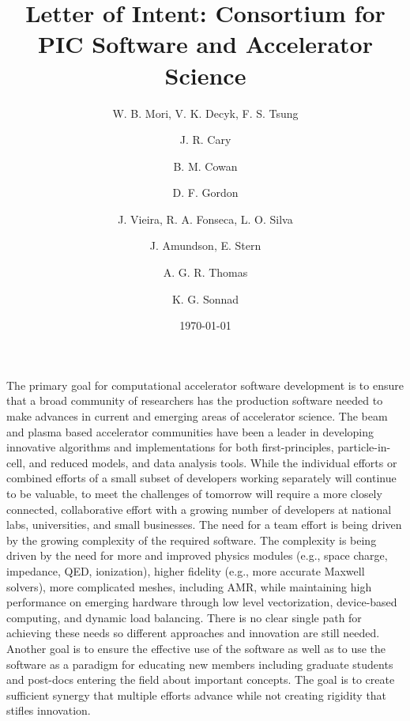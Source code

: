 \documentclass[aps,prstab,reprint,groupedaddress,nofootinbib]{revtex4-1}
\begin{document}
\title{Letter of Intent: Consortium for PIC Software and Accelerator Science}
\author{W. B. Mori, V. K. Decyk, F. S. Tsung}
\author{J. R. Cary}
\author{B. M. Cowan}
\author{D. F. Gordon}
\author{J. Vieira, R. A. Fonseca, L. O. Silva}
\author{J. Amundson, E. Stern}
\author{A. G. R. Thomas}
\author{K. G. Sonnad}

\date{\today}

\maketitle


\maketitle

The primary goal for computational accelerator software development is to ensure that a broad 
community of researchers has the production software needed to make advances in current and emerging areas of accelerator science.  The beam and plasma based accelerator communities have been a leader in developing innovative algorithms and implementations for both first-principles,  particle-in-cell,  and reduced models, and data analysis tools.  While the individual efforts or combined efforts of a small subset of developers working separately will continue to be valuable, to meet the challenges of tomorrow will require a more closely connected, collaborative effort with a growing number of developers at national labs, universities, and small businesses. The need for a team effort is being driven by the growing complexity of the required software. The complexity is being driven by the need for more and improved physics modules (e.g., space charge, impedance, QED, ionization), higher fidelity (e.g., more accurate Maxwell solvers), more complicated meshes, including AMR, while maintaining high performance on emerging hardware through low level vectorization, device-based computing, and dynamic load balancing. There is no clear single path for achieving these needs so different approaches and innovation are still needed. Another goal is to ensure the effective use of the software as well as to use the software as a paradigm for educating new members including graduate students and post-docs entering the field about important concepts.  The goal is to create sufficient synergy that multiple efforts advance while not creating rigidity that stifles innovation.
\end{document}
